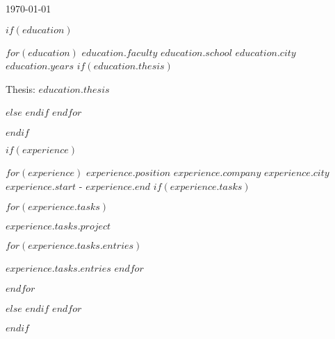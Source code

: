 \documentclass[$settings.fontSize$, $settings.format$]{awesome-cv}
\begin{document}
\makecvheader
{}
{\today}
{\thepage}

$if(education)$
\begin{cventries}
    $for(education)$
    \cventry
    {$education.faculty$}
    {$education.school$}
    {$education.city$}
    {$education.years$}
    $if(education.thesis)$
    {
        \begin{cvitems}
            \item{Thesis: $education.thesis$}
        \end{cvitems}
    }
    $else$
    {}
    $endif$
    $endfor$
\end{cventries}
$endif$

$if(experience)$
\begin{cventries}
    $for(experience)$
    \cventry
    {$experience.position$}
    {$experience.company$}
    {$experience.city$}
    {$experience.start$ - $experience.end$}
    $if(experience.tasks)$
    {
        \begin{cvitems}
            $for(experience.tasks)$
            \item[]{
                \textbf{$experience.tasks.project$}
                \begin{description}
                    $for(experience.tasks.entries)$
                    \item $experience.tasks.entries$
                    $endfor$
                    \item
                \end{description}
            }
            $endfor$
        \end{cvitems}
    }
    $else$
    {}
    $endif$
    $endfor$
\end{cventries}
$endif$
\end{document}
